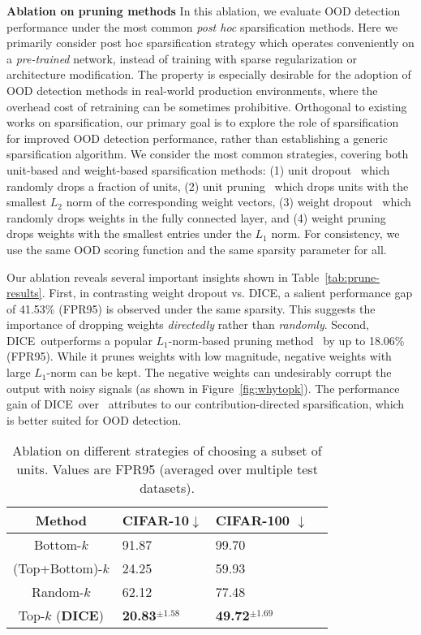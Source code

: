 \documentclass[runningheads]{llncs}
\newcommand{\methodAbbr}{DICE~}
\begin{document}
\noindent \textbf{Ablation on  pruning methods} In this ablation, we evaluate OOD detection performance under the most common \emph{post hoc} sparsification methods. Here we primarily consider {post hoc} sparsification strategy which
operates conveniently on a \emph{pre-trained} network, instead of training with sparse regularization or architecture modification. The property is especially desirable for the adoption of OOD detection methods in real-world production environments, where the overhead cost of retraining can be sometimes prohibitive.   Orthogonal to existing works on sparsification, our primary goal is to explore the role of sparsification for improved  OOD detection performance, {rather than establishing a generic sparsification algorithm}. We consider the most common strategies, covering both unit-based and weight-based sparsification methods: (1) {unit dropout}~\cite{Nitish2014dropout} which randomly drops a fraction of units, (2) {unit pruning}~\cite{Hao2017pruneUnit} which
drops units with the smallest $L_2$ norm of the corresponding weight vectors, (3) {weight dropout}~\cite{Wan2013weightdropout} which randomly drops weights in the fully connected layer, and (4) {weight pruning}~\cite{Han2015prune} drops weights with the smallest entries under the $L_1$ norm. For consistency, we use the same OOD scoring function and the same sparsity parameter for all. 




Our ablation reveals several important insights shown in Table~\ref{tab:prune-results}. 
First, in contrasting weight dropout vs. DICE, a salient performance gap of {41.53}\% (FPR95) is observed under the same sparsity. This suggests the importance of dropping weights \emph{directedly} rather than \emph{randomly}. Second, \methodAbbr outperforms a popular $L_1$-norm-based pruning method~\cite{Han2015prune} by up to {18.06}\% (FPR95). While it prunes weights with low magnitude, negative weights with large $L_1$-norm can be kept. The negative weights can undesirably corrupt the output with noisy signals (as shown in Figure~\ref{fig:whytopk}). The performance gain of \methodAbbr over~\cite{Han2015prune} attributes to our contribution-directed sparsification, which is better suited for OOD detection. 


\begin{table}
    \caption{\small Ablation on different strategies of choosing a subset of units.  Values are FPR95 (averaged over multiple test datasets).}
    \centering
        \begin{tabular}{c|lll}
        \toprule
        Method  & CIFAR-10\textbf{$\downarrow$} & CIFAR-100 \textbf{$\downarrow$}\\
        \midrule
         Bottom-$k$ & 91.87 & 99.70 \\
         (Top+Bottom)-$k$  & 24.25 & 59.93\\
          Random-$k$ & 62.12 & 77.48 \\
         Top-$k$ (\textbf{DICE}) & \textbf{20.83}$^{\pm{1.58}}$ & \textbf{49.72}$^{\pm{1.69}}$ \\
         \bottomrule
        \end{tabular}
    \label{tab:topbot}
\end{table}
\end{document}
